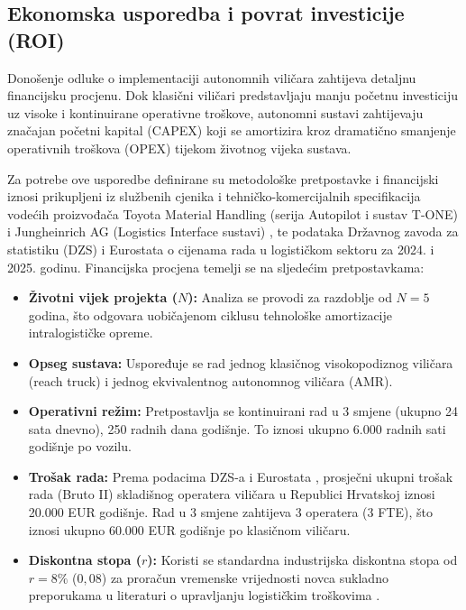 \documentclass[12pt,a4paper]{article}
\begin{document}
\subsection{Ekonomska usporedba i povrat investicije (ROI)}
Donošenje odluke o implementaciji autonomnih viličara zahtijeva detaljnu financijsku procjenu. Dok klasični viličari predstavljaju manju početnu investiciju uz visoke i kontinuirane operativne troškove, autonomni sustavi zahtijevaju značajan početni kapital (CAPEX) koji se amortizira kroz dramatično smanjenje operativnih troškova (OPEX) tijekom životnog vijeka sustava.

Za potrebe ove usporedbe definirane su metodološke pretpostavke i financijski iznosi prikupljeni iz službenih cjenika i tehničko-komercijalnih specifikacija vodećih proizvođača Toyota Material Handling (serija Autopilot i sustav T-ONE) \cite{toyota} i Jungheinrich AG (Logistics Interface sustavi) \cite{jungheinrich}, te podataka Državnog zavoda za statistiku (DZS) \cite{dzs} i Eurostata \cite{eurostat} o cijenama rada u logističkom sektoru za 2024. i 2025. godinu.
Financijska procjena temelji se na sljedećim pretpostavkama:
\begin{itemize}
    \item \textbf{Životni vijek projekta ($N$):} Analiza se provodi za razdoblje od $N = 5$ godina, što odgovara uobičajenom ciklusu tehnološke amortizacije intralogističke opreme.
    \item \textbf{Opseg sustava:} Uspoređuje se rad jednog klasičnog visokopodiznog viličara (reach truck) i jednog ekvivalentnog autonomnog viličara (AMR).
    \item \textbf{Operativni režim:} Pretpostavlja se kontinuirani rad u 3 smjene (ukupno 24 sata dnevno), 250 radnih dana godišnje. To iznosi ukupno 6.000 radnih sati godišnje po vozilu.
    \item \textbf{Trošak rada:} Prema podacima DZS-a i Eurostata \cite{dzs, eurostat}, prosječni ukupni trošak rada (Bruto II) skladišnog operatera viličara u Republici Hrvatskoj iznosi 20.000 EUR godišnje. Rad u 3 smjene zahtijeva 3 operatera (3 FTE), što iznosi ukupno 60.000 EUR godišnje po klasičnom viličaru.
    \item \textbf{Diskontna stopa ($r$):} Koristi se standardna industrijska diskontna stopa od $r = 8\%$ ($0,08$) za proračun vremenske vrijednosti novca sukladno preporukama u literaturi o upravljanju logističkim troškovima \cite{bowersox}.
\end{itemize}
\end{document}
